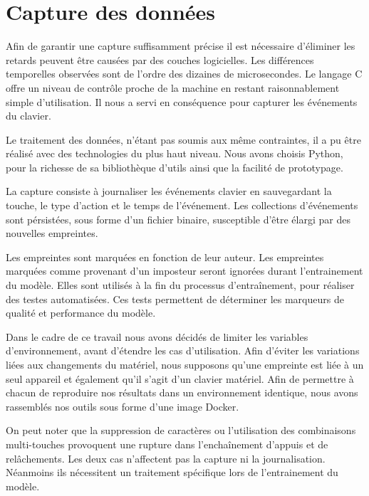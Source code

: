 \section{Capture des données}

Afin de garantir une capture suffisamment précise il est nécessaire d’éliminer les retards peuvent être causées par des couches logicielles. Les différences temporelles observées sont de l'ordre des dizaines de microsecondes. Le langage C offre un niveau de contrôle proche de la machine en restant raisonnablement simple d'utilisation. Il nous a servi en conséquence pour capturer les événements du clavier. 

Le traitement des données, n’étant pas soumis aux même contraintes, il a pu être réalisé avec des technologies du plus haut niveau. Nous avons choisis Python, pour la richesse de sa bibliothèque d’utils ainsi que la facilité de prototypage.

La capture consiste à journaliser les événements clavier en sauvegardant la touche, le type d’action et le temps de l’événement. Les collections d’événements sont pérsistées, sous forme d’un fichier binaire, susceptible d’être élargi par des nouvelles empreintes.

Les empreintes sont marquées en fonction de leur auteur. Les empreintes marquées comme provenant d'un imposteur seront ignorées durant l’entrainement du modèle. Elles sont utilisés à la fin du processus d’entraînement, pour réaliser des testes automatisées. Ces tests permettent de déterminer les marqueurs de qualité et performance du modèle.

Dans le cadre de ce travail nous avons décidés de limiter les variables d’environnement, avant d’étendre les cas d’utilisation. Afin d’éviter les variations liées aux changements du matériel, nous supposons qu’une empreinte est liée à un seul appareil et également qu’il s’agit d’un clavier matériel. Afin de permettre à chacun de reproduire nos résultats dans un environnement identique, nous avons rassemblés nos outils sous forme d'une image Docker.

On peut noter que la suppression de caractères ou l'utilisation des combinaisons multi-touches provoquent une rupture dans l’enchaînement d’appuis et de relâchements. Les deux cas n'affectent pas la capture ni la journalisation. Néanmoins ils nécessitent un traitement spécifique lors de l'entrainement du modèle.
